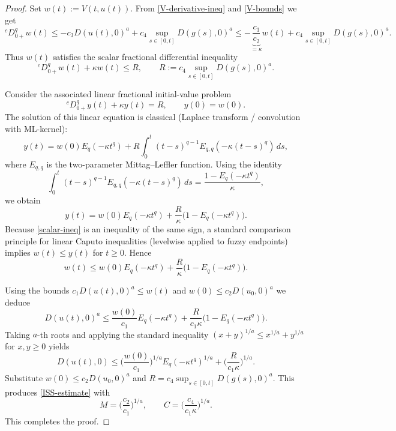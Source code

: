 \documentclass[10pt,a4paper]{amsart}
\newcommand{\Haus}{D}
\begin{document}
	\begin{proof}
		Set \(w(t):=V(t,u(t))\). From \eqref{V-derivative-ineq} and \eqref{V-bounds} we get
		\[
		{}^cD_{0+}^q w(t)\le -c_3\Haus(u(t),0)^a + c_4\sup_{s\in[0,t]}\Haus(g(s),0)^a
		\le -\underbrace{\frac{c_3}{c_2}}_{=\kappa} w(t) + c_4\sup_{s\in[0,t]}\Haus(g(s),0)^a.
		\]
		Thus \(w(t)\) satisfies the scalar fractional differential inequality
		\begin{equation}\label{scalar-ineq}
			{}^cD_{0+}^q w(t) + \kappa w(t) \le R,\qquad R:=c_4\sup_{s\in[0,t]}\Haus(g(s),0)^a.
		\end{equation}
		
		Consider the associated linear fractional initial-value problem
		\[
		{}^cD_{0+}^q y(t) + \kappa y(t) = R,\qquad y(0)=w(0).
		\]
		The solution of this linear equation is classical (Laplace transform / convolution with ML-kernel):
		\[
		y(t)=w(0)E_q(-\kappa t^q)+R\int_0^t (t-s)^{q-1}E_{q,q}(-\kappa(t-s)^q)\,ds,
		\]
		where \(E_{q,q}\) is the two-parameter Mittag--Leffler function. Using the identity
		\[
		\int_0^t (t-s)^{q-1}E_{q,q}(-\kappa(t-s)^q)\,ds=\frac{1-E_q(-\kappa t^q)}{\kappa},
		\]
		we obtain
		\[
		y(t)=w(0)E_q(-\kappa t^q)+\frac{R}{\kappa}\big(1-E_q(-\kappa t^q)\big).
		\]
		Because \eqref{scalar-ineq} is an inequality of the same sign, a standard comparison principle for linear Caputo inequalities (levelwise applied to fuzzy endpoints) implies \(w(t)\le y(t)\) for \(t\ge0\). Hence
		\[
		w(t)\le w(0)E_q(-\kappa t^q)+\frac{R}{\kappa}\big(1-E_q(-\kappa t^q)\big).
		\]
		
		Using the bounds \(c_1\Haus(u(t),0)^a \le w(t)\) and \(w(0)\le c_2\Haus(u_0,0)^a\) we deduce
		\[
		\Haus(u(t),0)^a \le \frac{w(0)}{c_1}E_q(-\kappa t^q)+\frac{R}{c_1\kappa}\big(1-E_q(-\kappa t^q)\big).
		\]
		Taking \(a\)-th roots and applying the standard inequality \((x+y)^{1/a}\le x^{1/a}+y^{1/a}\) for \(x,y\ge0\) yields
		\[
		\Haus(u(t),0)\le \Big(\frac{w(0)}{c_1}\Big)^{1/a}E_q(-\kappa t^q)^{1/a}+\Big(\frac{R}{c_1\kappa}\Big)^{1/a}.
		\]
		Substitute \(w(0)\le c_2\Haus(u_0,0)^a\) and \(R=c_4\sup_{s\in[0,t]}\Haus(g(s),0)^a\). This produces \eqref{ISS-estimate} with
		\[
		M=\Big(\frac{c_2}{c_1}\Big)^{1/a},\qquad C=\Big(\frac{c_4}{c_1\kappa}\Big)^{1/a}.
		\]
		This completes the proof.
	\end{proof}
\end{document}
